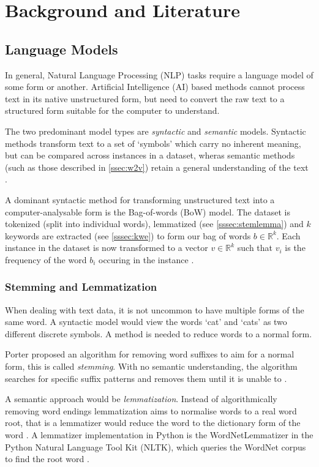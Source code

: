 \section{Background and Literature}\label{sec:lit}

\subsection{Language Models}\label{ssec:kwe}
In general, Natural Language Processing (NLP) tasks require a language model of some form or another.
Artificial Intelligence (AI) based methods cannot process text in its native unstructured form, but need to convert the
raw text to a structured form suitable for the computer to understand.

The two predominant model types are \emph{syntactic} and \emph{semantic} models. 
Syntactic methods transform text to a set of `symbols' which carry no inherent meaning, but can be 
compared across instances in a dataset, wheras semantic methods (such as those described in \autoref{ssec:w2v})
retain a general understanding of the text \cite{Cambria2014}.

A dominant syntactic method for transforming unstructured text into a computer-analysable form is the Bag-of-words 
(BoW) model. 
The dataset is tokenized (split into individual words), lemmatized (see \autoref{sssec:stemlemma})
and $k$ keywords are extracted (see \autoref{sssec:kwe}) to form our bag of words $b\in \mathbb{R} ^{k}$.
Each instance in the dataset is now transformed to a vector $v\in \mathbb{R} ^{k}$ such that $v_i$ is the frequency 
of the word $b_i$ occuring in the instance \cite{Cambria2014, StevenBirdEwanKlein2009, Zhang2010}.

\subsubsection{Stemming and Lemmatization}\label{sssec:stemlemma}
When dealing with text data, it is not uncommon to have multiple forms of the same word.  A syntactic model would view
the words `cat' and `cats' as two different discrete symbols.  A method is needed to reduce words to a normal form.

Porter proposed an algorithm for removing word suffixes to aim for a normal form, this is called
\emph{stemming}. With no semantic understanding, the algorithm searches for specific suffix patterns and removes them
until it is unable to \cite{Porter1980}.

A semantic approach would be \emph{lemmatization}. Instead of algorithmically removing word endings lemmatization 
aims to normalise words to a real word root, that is a lemmatizer would reduce the word to the dictionary
form of the word \cite{Jayakodi2016}.  A lemmatizer implementation in Python is the WordNetLemmatizer in the Python 
Natural Language Tool Kit (NLTK), which queries the WordNet corpus to find the root word 
\cite{StevenBirdEwanKlein2009, princetonuniversity_2010}. 
 
